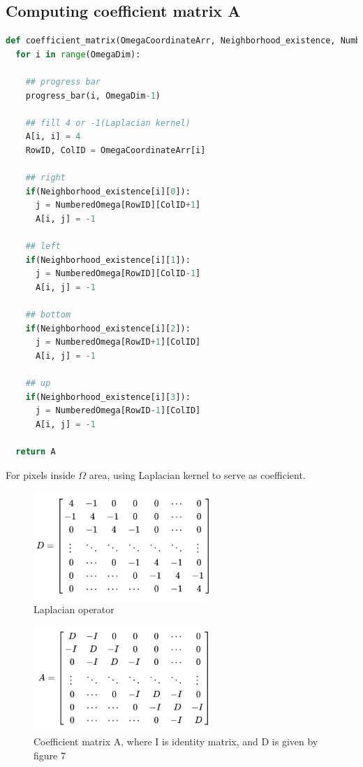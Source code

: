 \documentclass[10pt, a4paper]{article}%
\begin{document}
 \subsection{Computing coefficient matrix A}
 \begin{lstlisting}[language=python]
 def coefficient_matrix(OmegaCoordinateArr, Neighborhood_existence, NumberedOmega, A, OmegaDim):
  for i in range(OmegaDim):

    ## progress bar
    progress_bar(i, OmegaDim-1)

    ## fill 4 or -1(Laplacian kernel)
    A[i, i] = 4
    RowID, ColID = OmegaCoordinateArr[i]

    ## right
    if(Neighborhood_existence[i][0]):
      j = NumberedOmega[RowID][ColID+1]
      A[i, j] = -1

    ## left
    if(Neighborhood_existence[i][1]):
      j = NumberedOmega[RowID][ColID-1]
      A[i, j] = -1

    ## bottom
    if(Neighborhood_existence[i][2]):
      j = NumberedOmega[RowID+1][ColID]
      A[i, j] = -1

    ## up
    if(Neighborhood_existence[i][3]):
      j = NumberedOmega[RowID-1][ColID]
      A[i, j] = -1

  return A
 \end{lstlisting}
 For pixels inside $\Omega$ area, using Laplacian kernel to serve as coefficient.
 \begin{figure}[H]
     \centering
     \includegraphics[width=0.6\textwidth]{LaplacianOperator.jpg}
     \caption{Laplacian operator}
     \label{fig:my_label}
 \end{figure}
 \begin{figure}[H]
     \centering
     \includegraphics[width=0.6\textwidth]{Amatrix.jpg}
     \caption{Coefficient matrix A, where I is identity matrix, and D is given by figure 7}
     \label{fig:my_label}
 \end{figure}
\end{document}
